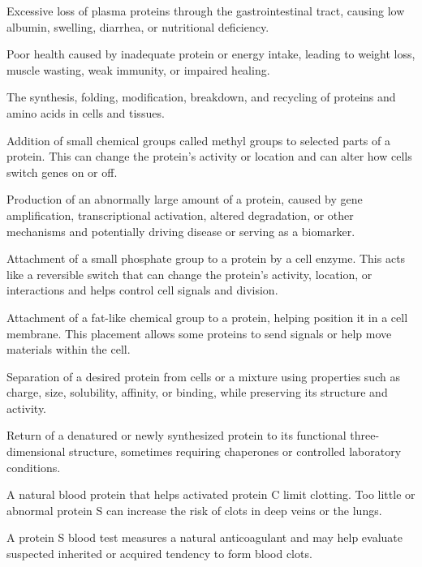 Excessive loss of plasma proteins through the gastrointestinal tract, causing low albumin, swelling, diarrhea, or nutritional deficiency.

 Poor health caused by inadequate protein or energy intake, leading to weight loss, muscle wasting, weak immunity, or impaired healing.

 The synthesis, folding, modification, breakdown, and recycling of proteins and amino acids in cells and tissues.

 Addition of small chemical groups called methyl groups to selected parts of a protein. This can change the protein’s activity or location and can alter how cells switch genes on or off.

 Production of an abnormally large amount of a protein, caused by gene amplification, transcriptional activation, altered degradation, or other mechanisms and potentially driving disease or serving as a biomarker.

 Attachment of a small phosphate group to a protein by a cell enzyme. This acts like a reversible switch that can change the protein’s activity, location, or interactions and helps control cell signals and division.

 Attachment of a fat-like chemical group to a protein, helping position it in a cell membrane. This placement allows some proteins to send signals or help move materials within the cell.

 Separation of a desired protein from cells or a mixture using properties such as charge, size, solubility, affinity, or binding, while preserving its structure and activity.

 Return of a denatured or newly synthesized protein to its functional three-dimensional structure, sometimes requiring chaperones or controlled laboratory conditions.

 A natural blood protein that helps activated protein C limit clotting. Too little or abnormal protein S can increase the risk of clots in deep veins or the lungs.

 A protein S blood test measures a natural anticoagulant and may help evaluate suspected inherited or acquired tendency to form blood clots.

